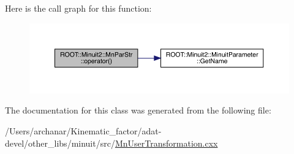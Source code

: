Here is the call graph for this function\+:
\nopagebreak
\begin{figure}[H]
\begin{center}
\leavevmode
\includegraphics[width=350pt]{d7/df5/classROOT_1_1Minuit2_1_1MnParStr_a34637805bbe12052e26f2eab37d23ff1_cgraph}
\end{center}
\end{figure}


The documentation for this class was generated from the following file\+:\begin{DoxyCompactItemize}
\item 
/\+Users/archanar/\+Kinematic\+\_\+factor/adat-\/devel/other\+\_\+libs/minuit/src/\mbox{\hyperlink{adat-devel_2other__libs_2minuit_2src_2MnUserTransformation_8cxx}{Mn\+User\+Transformation.\+cxx}}\end{DoxyCompactItemize}
